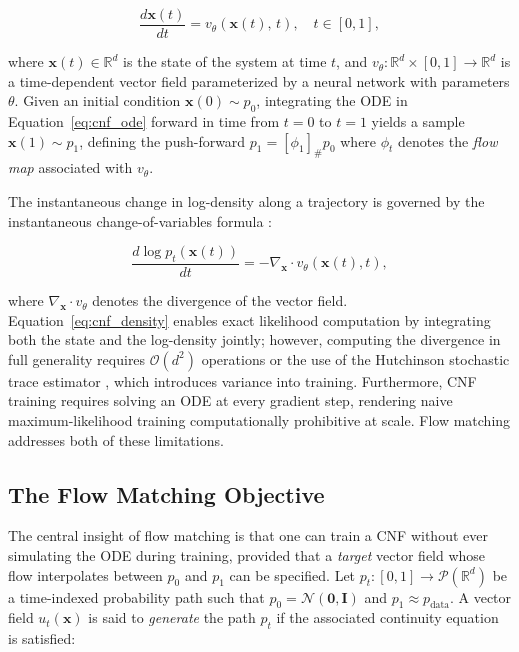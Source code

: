 \begin{equation}
    \frac{d\mathbf{x}(t)}{dt} = v_\theta(\mathbf{x}(t),\, t), \quad t \in [0, 1],
    \label{eq:cnf_ode}
\end{equation}

\noindent where $\mathbf{x}(t) \in \mathbb{R}^d$ is the state of the system at time $t$,
and $v_\theta : \mathbb{R}^d \times [0,1] \to \mathbb{R}^d$ is a time-dependent vector
field parameterized by a neural network with parameters $\theta$. Given an initial
condition $\mathbf{x}(0) \sim p_0$, integrating the ODE in Equation~\ref{eq:cnf_ode}
forward in time from $t=0$ to $t=1$ yields a sample $\mathbf{x}(1) \sim p_1$, defining
the push-forward $p_1 = [\phi_1]_\# p_0$ where $\phi_t$ denotes the \emph{flow map}
associated with $v_\theta$.

The instantaneous change in log-density along a trajectory is governed by the
instantaneous change-of-variables formula \cite{chen2018neural}:

\begin{equation}
    \frac{d \log p_t(\mathbf{x}(t))}{dt} = -\nabla_{\mathbf{x}} \cdot v_\theta(\mathbf{x}(t), t),
    \label{eq:cnf_density}
\end{equation}

\noindent where $\nabla_{\mathbf{x}} \cdot v_\theta$ denotes the divergence of the
vector field. Equation~\ref{eq:cnf_density} enables exact likelihood computation by
integrating both the state and the log-density jointly; however, computing the
divergence in full generality requires $\mathcal{O}(d^2)$ operations or the use of
the Hutchinson stochastic trace estimator \cite{hutchinson1989stochastic}, which introduces
variance into training. Furthermore, CNF training requires solving an ODE at every
gradient step, rendering naive maximum-likelihood training computationally prohibitive
at scale. Flow matching addresses both of these limitations.

\subsection{The Flow Matching Objective}
\label{subsec:flow_matching_objective}

The central insight of flow matching \cite{lipman2022flow} is that one can train a CNF
without ever simulating the ODE during training, provided that a \emph{target} vector
field whose flow interpolates between $p_0$ and $p_1$ can be specified. Let
$p_t : [0,1] \to \mathcal{P}(\mathbb{R}^d)$ be a time-indexed probability path such
that $p_0 = \mathcal{N}(\mathbf{0}, \mathbf{I})$ and $p_1 \approx p_{\text{data}}$.
A vector field $u_t(\mathbf{x})$ is said to \emph{generate} the path $p_t$ if the
associated continuity equation is satisfied:

